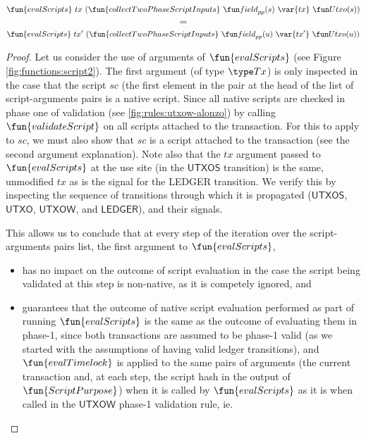 \begin{property}
\begin{corollary}
  \[\fun{evalScripts}~{tx}~ (\fun{collectTwoPhaseScriptInputs} ~\field_{pp}(s)~\var{tx}~ \Utxo(s))\]
  \[ = \]
  \[\fun{evalScripts}~{tx'}~ (\fun{collectTwoPhaseScriptInputs} ~\field_{pp}(u)~\var{tx'}~ \Utxo(u))\]

\end{corollary}

\begin{proof}
  Let us consider the use of arguments of $\fun{evalScripts}$ (see Figure \ref{fig:functions:script2}).
  The first argument (of type $\Tx$) is only inspected in the case that the script $sc$ (the first element
    in the pair at the head of the list of script-arguments pairs is a native script. Since all native scripts
    are checked in phase one of validation (see \ref{fig:rules:utxow-alonzo}) by calling $\fun{validateScript}$
    on all scripts attached to the transaction. For this to apply to $sc$, we must also show
    that $sc$ is a script attached to the transaction (see the second argument explanation).
    Note also that the $tx$ argument passed to $\fun{evalScripts}$ at the use site (in the $\mathsf{UTXOS}$ transition)
    is the same, unmodified $tx$ as is the signal for the LEDGER transition. We verify this by inspecting
    the sequence of transitions through which it is propagated
    ($\mathsf{UTXOS}$, $\mathsf{UTXO}$, $\mathsf{UTXOW}$, and $\mathsf{LEDGER}$), and their signals.

    This allows us to conclude that at every step of the iteration over the script-arguments pairs list,
    the first argument to $\fun{evalScripts}$,

    \begin{itemize}
      \item has no impact on the outcome of script evaluation in the case the script
      being validated at this step is non-native, as it is competely ignored, and

      \item guarantees that the outcome of native script evaluation performed
      as part of running $\fun{evalScripts}$ is the
      same as the outcome of evaluating them in phase-1, since both transactions
      are assumed to be phase-1 valid (as we started
      with the assumptions of having valid ledger transitions), and
      $\fun{evalTimelock}$ is applied to the same pairs of arguments (the current transaction
      and, at each step, the script hash in the output of $\fun{ScriptPurpose}$)
      when it is called by $\fun{evalScripts}$ as it is when called in the $\mathsf{UTXOW}$
      phase-1 validation rule, ie.


\end{itemize}
\end{proof}
\end{property}
